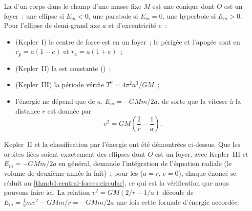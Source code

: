 \begin{theorem}\label{thm:b1:central-forces:conics}
La  d'un corps dans le champ d'une masse fixe $M$ est une
conique dont $O$ est un foyer~: une ellipse si $E_m < 0$, une parabole
si $E_m = 0$, une hyperbole si $E_m > 0$. Pour l'ellipse de demi-grand
axe $a$ et d'excentricité $e$~:
\begin{itemize}
  \item (Kepler~I) le centre de force est en un foyer~; le périgée et
        l'apogée sont en $r_p = a(1 - e)$ et $r_a = a(1 + e)$~;
  \item (Kepler~II) la  est constante ()~;
  \item (Kepler~III) la période vérifie $T^2 = 4\pi^2a^3/GM$~;
  \item l'énergie ne dépend que de $a$, $E_m = -GMm/2a$, de sorte que la
        vitesse à la distance $r$ est donnée par
        \[
        v^2 = GM\left(\frac{2}{r} - \frac{1}{a}\right) .
        \]
\end{itemize}
\end{theorem}
\admitted

\begin{remark}\label{rem:b1:central-forces:admitted}
Kepler~II et la classification par l'énergie ont été démontrées
ci-dessus. Que les orbites liées soient exactement des ellipses dont $O$
est un foyer, avec Kepler~III et $E_m = -GMm/2a$ en général, demande
l'intégration de l'équation radiale (le volume de deuxième année la
fait)~; pour les  ($a = r$, $e = 0$), chaque énoncé
se réduit au \cref{thm:b1:central-forces:circular}, ce qui est la
vérification que nous pouvons faire ici. La relation
$v^2 = GM(2/r - 1/a)$ découle de
$E_m = \tfrac12 mv^2 - GMm/r = -GMm/2a$ une fois cette formule d'énergie
accordée.
\end{remark}

